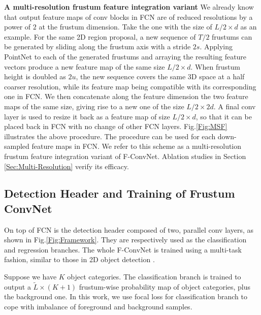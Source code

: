 \documentclass[letterpaper, 10 pt, conference]{ieeeconf}
\begin{document}
\vspace{0.1cm}
\noindent\textbf{A multi-resolution frustum feature integration variant}
We already know that output feature maps of conv blocks in FCN are of reduced resolutions by a power of $2$ at the frustum dimension. Take the one with the size of $L/2 \times d$ as an example. For the same 2D region proposal, a new sequence of $T/2$ frustums can be generated by sliding along the frustum axis with a stride $2s$. Applying PointNet to each of the generated frustums and arraying the resulting feature vectors produce a new feature map of the same size $L/2 \times d$. When frustum height is doubled as $2u$, the new sequence covers the same 3D space at a half coarser resolution, while its feature map being compatible with its corresponding one in FCN. We then concatenate along the feature dimension the two feature maps of the same size, giving rise to a new one of the size $L/2 \times 2d$. A final conv layer is used to resize it back as a feature map of size $L/2 \times d$, so that it can be placed back in FCN with no change of other FCN layers. Fig.\ref{Fig:MSF} illustrates the above procedure. The procedure can be used for each down-sampled feature maps in FCN. We refer to this scheme as a multi-resolution frustum feature integration variant of F-ConvNet. Ablation studies in Section \ref{Sec:Multi-Resolution} verify its efficacy.

\subsection{Detection Header and Training of Frustum ConvNet}

On top of FCN is the detection header composed of two, parallel conv layers, as shown in Fig.\ref{Fig:Framework}. They are respectively used as the classification and regression branches. The whole F-ConvNet is trained using a multi-task fashion, similar to those in 2D object detection \cite{girshick2015fast,ren2015faster, liu2016ssd}.

Suppose we have $K$ object categories. The classification branch is trained to output a $\tilde{L}\times (K+1)$ frustum-wise probability map of object categories, plus the background one. In this work, we use focal loss \cite{lin2017focal} for classification branch to cope with imbalance of foreground and background samples. 
\end{document}

